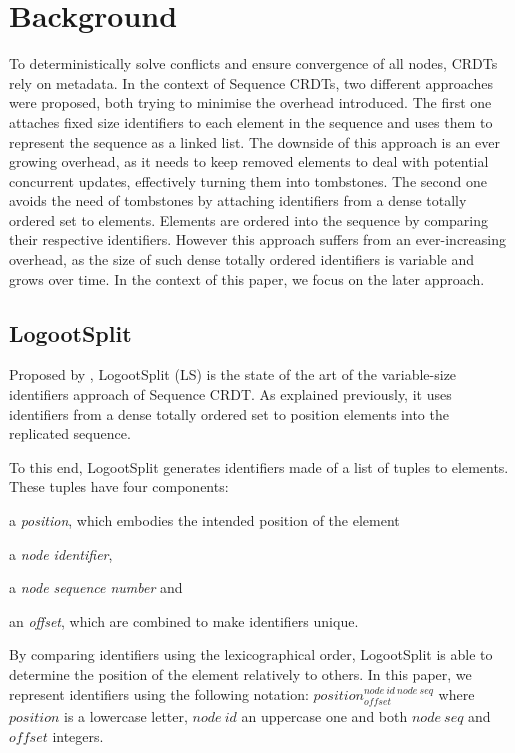 \documentclass[sigplan,10pt,authorversion]{acmart}
\newcommand{\trm}[1]{\mathit{#1}}
\newcommand{\id}[3]{$\trm{#1}^{\trm{#2}}_{\trm{#3}}$}
\begin{document}
\section{Background}
\label{sec:background}

To deterministically solve conflicts and ensure convergence of all nodes, \acp{CRDT} rely on metadata.
In the context of Sequence \acp{CRDT}, two different approaches were proposed, both trying to minimise the overhead introduced.
The first one \cite{oster:inria-00108523, ROH2011354,briot:hal-01343941} attaches fixed size identifiers to each element in the sequence and uses them to represent the sequence as a linked list.
The downside of this approach is an ever growing overhead, as it needs to keep removed elements to deal with potential concurrent updates, effectively turning them into tombstones.
The second one \cite{5158449,WeissICDCS09,AndreCollaborateCom2013} avoids the need of tombstones by attaching identifiers from a dense totally ordered set to elements.
Elements are ordered into the sequence by comparing their respective identifiers.
However this approach suffers from an ever-increasing overhead, as the size of such dense totally ordered identifiers is variable and grows over time.
In the context of this paper, we focus on the later approach.

\subsection{LogootSplit}

Proposed by \citet{AndreCollaborateCom2013}, LogootSplit (LS) is the state of the art of the variable-size identifiers approach of Sequence \ac{CRDT}.
As explained previously, it uses identifiers from a dense totally ordered set to position elements into the replicated sequence.

To this end, LogootSplit generates identifiers made of a list of tuples to elements.
These tuples have four components:
\begin{enumerate*}
    \item a \emph{position}, which embodies the intended position of the element
    \item a \emph{node identifier},
    \item a \emph{node sequence number} and
    \item an \emph{offset}, which are combined to make identifiers unique.
\end{enumerate*}
By comparing identifiers using the lexicographical order, LogootSplit is able to determine the position of the element relatively to others.
In this paper, we represent identifiers using the following notation: \id{position}{node~id~node~seq}{offset} where $\trm{position}$ is a lowercase letter, $\trm{node~id}$ an uppercase one and both $\trm{node~seq}$ and $\trm{offset}$ integers.
\end{document}
